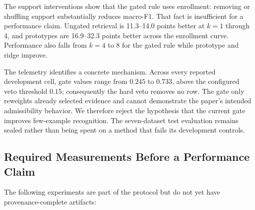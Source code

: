 The support interventions show that the gated rule uses enrollment: removing or shuffling support
substantially reduces macro-F1. That fact is insufficient for a performance claim. Ungated
retrieval is 11.3--14.0 points better at $k=1$ through 4, and prototypes are 16.9--32.3 points
better across the enrollment curve. Performance also falls from $k=4$ to 8 for the gated rule while
prototype and ridge improve.

The telemetry identifies a concrete mechanism. Across every reported development cell, gate values
range from $0.245$ to $0.733$, above the configured veto threshold $0.15$; consequently the hard
veto removes no row. The gate only reweights already selected evidence and cannot demonstrate the
paper's intended admissibility behavior. We therefore reject the hypothesis that the current gate
improves few-example recognition. The seven-dataset test evaluation remains sealed rather than
being spent on a method that fails its development controls.


\subsection{Required Measurements Before a Performance Claim}
\label{sec:pending_measurements}

The following experiments are part of the protocol but do not yet have provenance-complete
artifacts:

